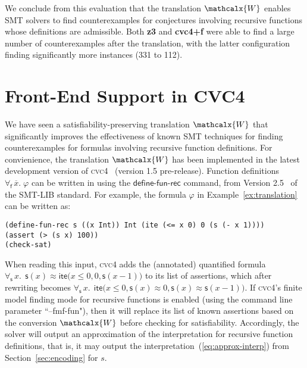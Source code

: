 \documentclass[runningheads,a4paper]{llncs}
\newcommand{\con}[1]{\mathsf{#1}}
\renewcommand\vec[1]{\overline{#1}}
\newcommand{\cvc}{\textsc{cvc}{\small 4}\xspace}
\newcommand{\teq}{\approx}
\newcommand{\conv}{\mathcalx{W}}
\newcommand{\lite}{\con{ite}}
\newcommand{\forallf}[1]{\forall_{\!#1\:}}
\newcommand{\definefunreccmd}{\con{define}\text{-}\con{fun}\text{-}\con{rec}}
\begin{document}
We conclude from this evaluation that the translation $\conv$ enables SMT solvers to find counterexamples 
for conjectures involving recursive functions whose definitions are admissible.
Both {\bf z3} and {\bf cvc4+f} were able to find a large number of counterexamples after the translation,
with the latter configuration finding significantly more instances (331 to 112).

\section{Front-End Support %
  in CVC4}
\label{sec:front-end}

We have seen a satisfiability-preserving translation $\conv$ that significantly improves the effectiveness of known SMT techniques
for finding counterexamples for formulas involving recursive function definitions.
For convienience, the translation $\conv$ has been implemented in the latest development version of \cvc~\cite{ReyEtAl-1-RR-13} (version 1.5 pre-release).
Function definitions $\forallf{\con{f}} \vec x.\; \varphi$ can be written in using the $\definefunreccmd$ command, 
from Version 2.5~\cite{} of the SMT-LIB standard.
For example, the formula $\varphi$ in Example~\ref{ex:translation} 
can be written as:

{\small
\begin{verbatim}
(define-fun-rec s ((x Int)) Int (ite (<= x 0) 0 (s (- x 1))))
(assert (> (s x) 100))
(check-sat)
\end{verbatim}
}

When reading this input, 
\cvc adds the (annotated) quantified formula $\forallf{\con{s}} x.\;\, \con{s}( x ) \teq \lite\bigl( x \leq 0, 0, \con{s}( x-1 )\bigr)$ to its list of assertions,
which after rewriting becomes $\forallf{\con{s}} x.\;\, \lite\bigl( x \leq 0, \con{s}( x ) \teq 0, \con{s}( x ) \teq \con{s}( x-1 ) \bigr)$.
If \cvc's finite model finding mode for recursive functions is enabled (using the command line parameter ``--fmf-fun"),
then it will replace its list of known assertions based on the conversion $\conv$ before checking for satisfiability.
Accordingly, the solver will output an approximation of the interpretation for recursive function definitions,
that is, it may output the interpretation~(\ref{eq:approx-interp}) from Section~\ref{sec:encoding} for $s$.
\end{document}
